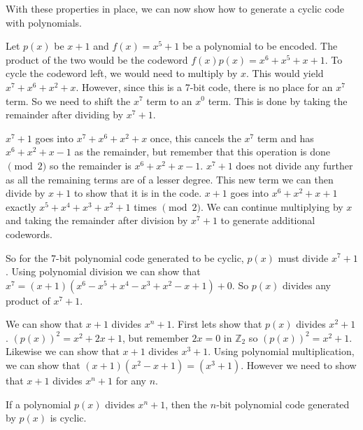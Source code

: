 
With these properties in place, we can now show how to generate a cyclic code with polynomials.  

\begin{example}
Let $p(x)$ be $x+1$ and $f(x) = x^5 + 1$ be a polynomial to be encoded.  The product of the two would be the codeword $f(x)p(x) = x^6 + x^5 + x + 1$.  To cycle the codeword left, we would need to multiply by $x$. This would yield $x^7 + x^6 + x^2 + x$.  However, since this is a 7-bit code, there is no place for an $x^7$ term.  So we need to shift the $x^7$ term to an $x^0$ term.  This is done by 
taking the remainder after dividing by $x^7+1$.  

$x^7 + 1$ goes into $x^7 + x^6 + x^2 + x$ once, this cancels the $x^7$ term and has $x^6 + x^2 + x - 1$ as the remainder, but remember that this operation is done $\pmod 2$ so the remainder is $x^6 + x^2 + x - 1$.  $x^7 + 1$ does not divide any further as all the remaining terms are of a lesser degree.  
This new term we can then divide by $x+1$ to show that it is in the code.  $x+1$ goes into $x^6 + x^2 + x + 1$ exactly $x^5 + x^4 + x^3 + x^2 + 1$ times $\pmod2$.  We can continue multiplying by $x$ and taking the remainder after division by $x^7 + 1$ to generate additional codewords.

So for the 7-bit polynomial code generated to be cyclic, $p(x)$ must divide $x^7 + 1$.  Using polynomial division we can show that $x^7 = (x+1)(x^6-x^5+x^4-x^3+x^2-x+1) + 0$.  So $p(x)$ divides any product of $x^7+1$.

We can show that $x+1$ divides $x^n + 1$.  First lets show that $p(x)$ divides $x^2 + 1$.  $(p(x))^2 = x^2 + 2x + 1$, but remember $2x = 0$ in $\mathbb{Z}_2$ so $(p(x))^2 = x^2 + 1$. Likewise we can show that $x+1$ divides $x^3 + 1$.  Using polynomial multiplication, we can show that $(x+1)(x^2 -x + 1) = (x^3 + 1)$.  However we need to show that $x+1$ divides $x^n+1$ for any $n$.
\end{example}

\begin{prop}
If a polynomial $p(x)$ divides $x^n + 1$, then the $n$-bit polynomial code generated by $p(x)$ is cyclic.
\end{prop}

